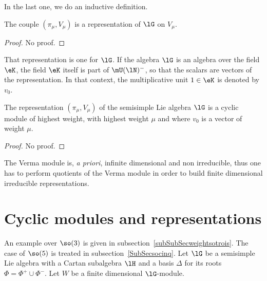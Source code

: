 In the last one, we do an inductive definition.
\begin{lemma}
	The couple $(\pi_{\mu},V_{\mu})$ is a representation of $\lG$ on $V_{\mu}$.
\end{lemma}
\begin{proof}
	No proof.
\end{proof}
That representation is one  for $\lG$. If the algebra $\lG$ is an algebra over the field $\eK$, the field $\eK$ itself is part of $\mU(\lN)^-$, so that the scalars are vectors of the representation. In that context, the multiplicative unit $1\in \eK$ is denoted by $v_0$.

\begin{theorem}
	The representation $(\pi_{\mu},V_{\mu})$ of the semisimple Lie algebra $\lG$ is a cyclic module of highest weight, with highest weight $\mu$ and where $v_0$ is a vector of weight $\mu$.
\end{theorem}
\begin{proof}
	No proof.
\end{proof}
The Verma module is, \emph{a priori}, infinite dimensional and non irreducible, thus one has to perform quotients of the Verma module in order to build finite dimensional irreducible representations.


\section{Cyclic modules and representations}

An example over $\so(3)$ is given in subsection~\ref{subSubSecweightsotrois}. The case of $\so(5)$ is treated in subsection~\ref{SubSecsocinq}. Let $\lG$ be a semisimple Lie algebra with a Cartan subalgebra $\lH$ and a basis $\Delta$ for its roots $\Phi=\Phi^+\cup\Phi^-$. Let $W$ be a finite dimensional $\lG$-module.

